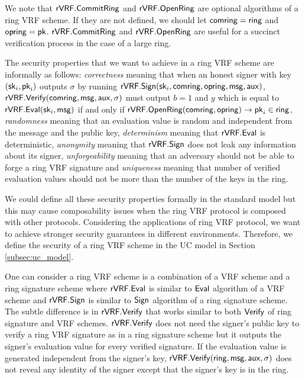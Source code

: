 We note that $ {\mathsf{rVRF}}.{\mathsf{CommitRing}} $ and $  {\mathsf{rVRF}}.{\mathsf{OpenRing}} $ are optional algorithms of a ring VRF scheme. If they are not defined, we should let $ \mathsf{comring} = \mathsf{ring} $ and $ \mathsf{opring}  = \mathsf{pk}$. $ {\mathsf{rVRF}}.{\mathsf{CommitRing}} $ and $  {\mathsf{rVRF}}.{\mathsf{OpenRing}} $ are useful for a succinct verification process in the case of a large ring.

The security properties that we want to achieve in a ring VRF scheme are informally as follows: \emph{correctness} meaning that when an honest signer with key $ (\mathsf{sk}_i,\mathsf{pk}_i) $ outputs $ \sigma $ by running $ {\mathsf{rVRF}}.{\mathsf{Sign}}(\mathsf{sk}_i, \mathsf{comring},\mathsf{opring}, \mathsf{msg}, \mathsf{aux}) $, $ {\mathsf{rVRF}}.{\mathsf{Verify}}(\mathsf{comring},\mathsf{msg},\mathsf{aux},\sigma)  $ must output $ b =1 $ and $ y $ which is equal to $ {\mathsf{rVRF}}.{\mathsf{Eval}}(\mathsf{sk}_i, \mathsf{msg}) $ if and only if $ {\mathsf{rVRF}}.{\mathsf{OpenRing}}(\mathsf{comring},\mathsf{opring}) \rightarrow \mathsf{pk}_i \in \mathsf{ring}$, \emph{randomness} meaning that an evaluation value is random and independent from the message and the public key, \emph{determinism} meaning that $ {\mathsf{rVRF}}.{\mathsf{Eval}} $ is deterministic, \emph{anonymity} meaning that $ {\mathsf{rVRF}}.{\mathsf{Sign}} $ does not leak any information about its signer, \emph{unforgeability} meaning that an adversary should not be able to forge a ring VRF signature and \emph{uniqueness} meaning that number of verified evaluation values should not be more than the number of the keys in the ring.


We could define all these security properties formally in the standard model but this may cause composability issues when the ring VRF protocol is composed with other protocols. Considering the applications of ring VRF protocol, we want to achieve stronger security guarantees in different environments. Therefore, we define the security of a ring VRF scheme in the UC model in Section \ref{subsec:uc_model}. 

One can consider a ring VRF scheme is a combination of a VRF scheme and a ring signature scheme where $ {\mathsf{rVRF}}.{\mathsf{Eval}} $ is similar to $ {\mathsf{Eval}} $ algorithm of a VRF scheme and $ {\mathsf{rVRF}}.{\mathsf{Sign}} $ is similar to $ {\mathsf{Sign}} $ algorithm of a ring signature scheme. The  subtle difference is in $ {\mathsf{rVRF}}.{\mathsf{Verify}} $ that works  similar to both $ {\mathsf{Verify}} $ of ring signature and VRF schemes.  $ {\mathsf{rVRF}}.{\mathsf{Verify}} $ does not need the signer's public key to verify a ring VRF signature as in a ring signature scheme but it outputs the signer's evaluation value for every verified signature. If the evaluation value is generated independent from the signer's key, $ {\mathsf{rVRF}}.{\mathsf{Verify}}(\mathsf{ring},\mathsf{msg},\mathsf{aux},\sigma) $ does not reveal any identity of the signer except that the signer's key is in the ring.


